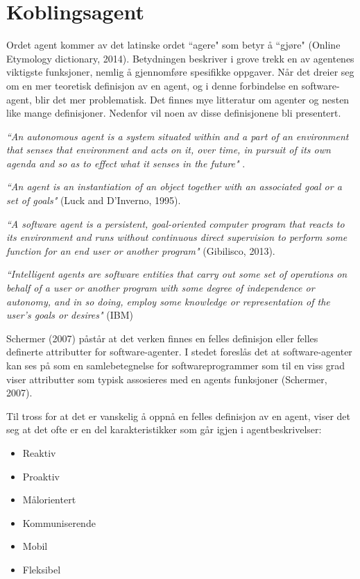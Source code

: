 \section{Koblingsagent}
Ordet agent kommer av det latinske ordet ``agere" som betyr å ``gjøre" (Online Etymology dictionary, 2014)\cite{website:agent}. Betydningen beskriver i grove trekk en av agentenes viktigste funksjoner, nemlig å gjennomføre spesifikke oppgaver. Når det dreier seg om en mer teoretisk definisjon av en agent, og i denne forbindelse en software-agent, blir det mer problematisk. Det finnes mye litteratur om agenter og nesten like mange definisjoner. Nedenfor vil noen av disse definisjonene bli presentert.

\textit{``An autonomous agent is a system situated within and a part of an environment
that senses that environment and acts on it, over time, in pursuit of its own agenda
and so as to effect what it senses in the future"} \cite{agent}.

\textit{``An agent is an instantiation of an object together with an associated goal or a set of goals"} (Luck and D'Inverno, 1995)\cite{luck_dinverno_agent}.

\textit{``A software agent is a persistent, goal-oriented computer program that reacts to its environment and runs without continuous direct supervision to perform some function for an end user or another program"} (Gibilisco, 2013)\cite{gibilesco_agent}.

\textit{``Intelligent agents are software entities that carry out some set of operations on behalf of a user or another program with some degree of independence or autonomy, and in so doing,
employ some knowledge or representation of the user's goals or desires"} (IBM)

Schermer (2007)\cite{schermer} påstår at det verken finnes en felles definisjon eller felles definerte attributter for software-agenter. I stedet foreslås det at software-agenter kan ses på som en samlebetegnelse for softwareprogrammer som til en viss grad viser attributter som typisk assosieres med en agents funksjoner (Schermer, 2007)\cite{schermer}.

Til tross for at det er vanskelig å oppnå en felles definisjon av en agent, viser det seg at det ofte er en del karakteristikker som går igjen i agentbeskrivelser:
\begin{itemize}
\item Reaktiv
\item Proaktiv
\item Målorientert
\item Kommuniserende
\item Mobil
\item Fleksibel
\end{itemize}

